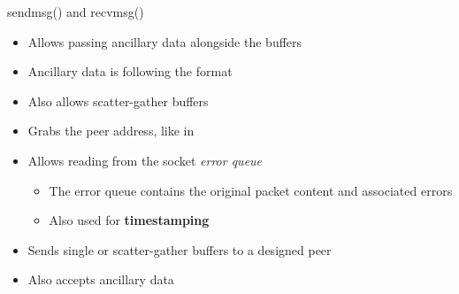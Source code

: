 \begin{frame}{sendmsg() and recvmsg()}
	\begin{itemize}
		\item Allows passing ancillary data alongside the buffers
		\item Ancillary data is following the  format
		\item Also allows scatter-gather buffers
	\end{itemize}
	\begin{itemize}
		\item Grabs the peer address, like in 
		\item Allows reading from the socket \textit{error queue}
			\begin{itemize}
				\item The error queue contains the original packet content and associated errors
				\item Also used for \textbf{timestamping}
			\end{itemize}
	\end{itemize}
	\vspace{0.5cm}
	\begin{itemize}
		\item Sends single or scatter-gather buffers to a designed peer
		\item Also accepts ancillary data
	\end{itemize}

\end{frame}

